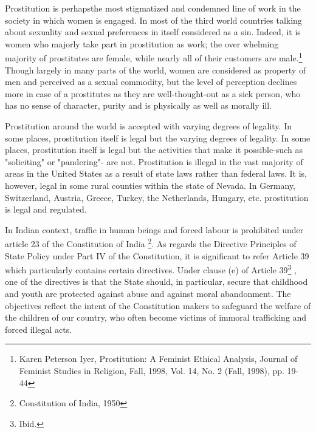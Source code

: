 \setcounter{figure}{0}
\setcounter{table}{0}
\setcounter{footnote}{0}

\label{2017-art3}

\begin{multicols}{2}


\noi
Prostitution is perhapsthe most stigmatized and condemned line of work in the society in which
women is engaged. In most of the third world countries talking about sexuality and sexual
preferences in itself considered as a sin. Indeed, it is women who majorly take part in
prostitution as work; the over whelming majority of prostitutes are female, while nearly all of
their customers are male.\footnote{Karen Peterson Iyer, Prostitution: A Feminist Ethical Analysis, Journal of Feminist Studies in Religion, Fall, 1998, Vol. 14, No. 2 (Fall, 1998), pp. 19-44} Though largely in many parts of the world, women are considered
as property of men and perceived as a sexual commodity, but the level of perception declines
more in case of a prostitutes as they are well-thought-out as a sick person, who has no sense of
character, purity and is physically as well as morally ill.

\noi
Prostitution around the world is accepted with varying degrees of legality. In some places,
prostitution itself is legal but the varying degrees of legality. In some places, prostitution itself
is legal but the activities that make it possible-such as "soliciting" or "pandering"- are not.
Prostitution is illegal in the vast majority of areas in the United States as a result of state laws
rather than federal laws. It is, however, legal in some rural counties within the state of Nevada.
In Germany, Switzerland, Austria, Greece, Turkey, the Netherlands, Hungary, etc. prostitution
is legal and regulated.

\noi
In Indian context, traffic in human beings and forced labour is prohibited under article 23 of
the Constitution of India \footnote{Constitution of India, 1950}. As regards the Directive Principles of State Policy under Part IV of
the Constitution, it is significant to refer Article 39 which particularly contains certain
directives. Under clause (e) of Article 39\footnote{Ibid.}
, one of the directives is that the State should, in
particular, secure that childhood and youth are protected against abuse and against moral
abandonment. The objectives reflect the intent of the Constitution makers to safeguard the
welfare of the children of our country, who often become victims of immoral trafficking and
forced illegal acts.


\end{multicols}

